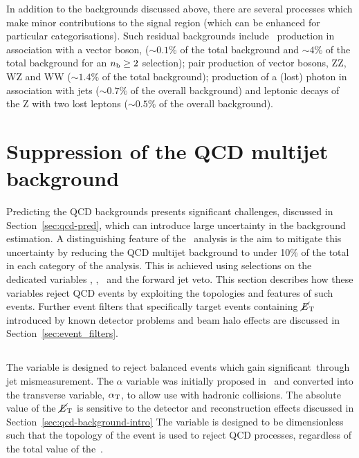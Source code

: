 In addition to the backgrounds discussed above, there are several processes which 
make minor contributions to the signal region (which can be enhanced
for particular categorisations). Such residual backgrounds include \ttbar~production in association with a vector
boson, \ttV ($\sim0.1\%$ of the total background and $\sim4\%$ of the total background for an $n_{\mathrm{b}} \ge 2$ selection); 
pair production of vector bosons, ZZ, WZ and WW ($\sim1.4\%$ of the total background); 
production of a (lost) photon in association with jets ($\sim0.7\%$ of the overall background) and
leptonic decays of the Z with two lost leptons ($\sim0.5\%$ of the overall background).

\section{Suppression of the QCD multijet background}
\label{sec:important-variables}

Predicting the QCD backgrounds presents significant challenges, discussed in Section~\ref{sec:qcd-pred}, which
can introduce large uncertainty in the background estimation. A distinguishing feature
of the \alphat~analysis is the aim to mitigate this uncertainty by reducing the 
QCD multijet background to under 10\% of the total in each category of the analysis. 
This is achieved using selections on the dedicated variables \alphat, \bdphi, \mhtmet~and the forward jet veto. This section
describes how these variables reject QCD events by exploiting the topologies and features of such events. Further
event filters that specifically target events containing $\mbox{$\cancel{E}_\text{T}$}$ introduced by
known detector problems and beam halo effects are discussed in Section~\ref{sec:event_filters}.

\subsection{\alphat}
The \alphat variable is designed to reject balanced events which gain significant~\met through
jet mismeasurement. The $\alpha$ variable was initially proposed in~\cite{Randall} and
converted into the transverse variable, $\alpha_{\text{T}}$, to allow use with hadronic collisions. The absolute
value of the $\mbox{$\cancel{E}_\text{T}$}$ is sensitive to the detector and reconstruction effects discussed in Section~\ref{sec:qcd-background-intro} 
The \alphat variable is designed to be dimensionless such that the topology of the event is used to reject 
QCD processes, regardless of the total value of the~\met.

